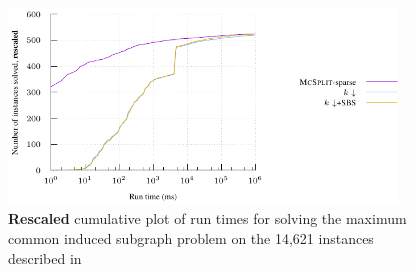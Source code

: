 \begin{figure}[htb]
    \centering
    \includegraphics*[width=0.92\textwidth]{14b-mcsplit-induced-si/sip-instances-mcis-experiment/experiment/plots/cumulative-rescaled.pdf}
    \caption{\textbf{Rescaled} cumulative plot of run times for solving the maximum common 
      induced subgraph problem on the 14,621 instances described in
      }
    \label{figure:mcsplit-sparse-cumulative-rescaled}
\end{figure}

